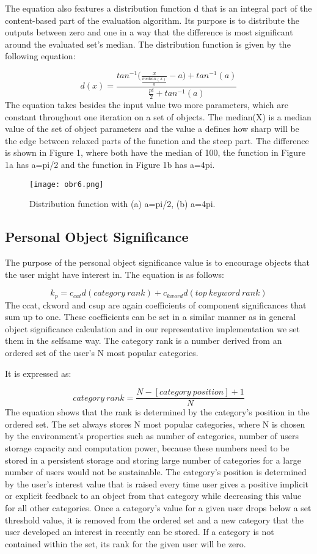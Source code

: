 \documentclass{llncs}
\begin{document}
The equation also features a distribution function d that is an integral part of the content-based part of the evaluation algorithm. Its purpose is to distribute the outputs between zero and one in a way that the difference is most significant around the evaluated set’s median. The distribution function is given by the following equation:

$$ d(x) =\frac {tan^{-1}\Big(\frac {x}{\frac{median(x)}{a}}- a \Big)+ tan^{-1}(a)}{\frac{pí}{2} + tan^{-1}(a)}$$
The equation takes besides the input value two more parameters, which are constant throughout one iteration on a set of objects. The median(X) is a median value of the set of object parameters and the value a defines how sharp will be the edge between relaxed parts of the function and the steep part. The difference is shown in Figure 1, where both have the median of 100, the function in Figure 1a has a=pi/2 and the function in Figure 1b has a=4pi.


\begin{figure}
\centering
\texttt{[image: obr6.png]}
\caption{Distribution function with (a) a=pi/2, (b) a=4pi.}
\end{figure}


\subsection{Personal Object Significance}
The purpose of the personal object significance value is to encourage objects that the user might have interest in. The equation is as follows:

$$k_p = c_{cat}d(category~rank) + c_{kword}d(top~keyword~rank)$$ 
The ccat, ckword and csup are again coefficients of component significances that sum up to one. These coefficients can be set in a similar manner as in general object significance calculation and in our representative implementation we set them in the selfsame way. The category rank is a number derived from an ordered set of the user’s N most popular categories.

It is expressed as:



$$category~rank = \frac{N - [category~position] +1 }{N}$$ 
The equation shows that the rank is determined by the category’s position in the ordered set. The set always stores N most popular categories, where N is chosen by the environment’s properties such as number of categories, number of users storage capacity and computation power, because these numbers need to be stored in a persistent storage and storing large number of categories for a large number of users would not be sustainable. The category’s position is determined by the user’s interest value that is raised every time user gives a positive implicit or explicit feedback to an object from that category while decreasing this value for all other categories. Once a category’s value for a given user drops below a set threshold value, it is removed from the ordered set and a new category that the user developed an interest in recently can be stored. If a category is not contained within the set, its rank for the given user will be zero.
\end{document}
